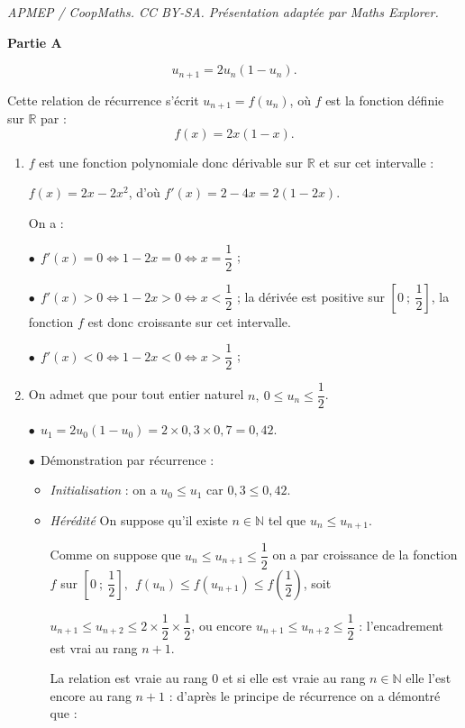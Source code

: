 \documentclass[10pt]{article}
\providecommand{\R}{\mathbb{R}}
\providecommand{\N}{\mathbb{N}}
\begin{document}
\noindent\textit{APMEP / CoopMaths. CC BY-SA. Présentation adaptée par Maths Explorer.}\par\medskip
\medskip

\textbf{Partie A}

\medskip


\[u_{n+1} =  2u_n\left(1 - u_n\right).\]

Cette relation de récurrence s'écrit $u_{n+1} =  f\left(u_n\right)$, où $f$ est la fonction définie sur $\R$ par :
\[f(x) = 2x(1 - x).\]

\smallskip
\begin{enumerate}
\item 
$f$ est une fonction polynomiale donc dérivable sur $\R$ et sur cet intervalle :

$f(x) = 2x - 2x^2$, d'où $f'(x) = 2 - 4x = 2(1 - 2x)$.

On a :

$\bullet~~$$f'(x) = 0 \iff 1 - 2x = 0 \iff x = \dfrac12$ ;

$\bullet~~$$f'(x) > 0 \iff 1 - 2x > 0 \iff x < \dfrac12$ ; la dérivée est positive sur $\left[0~;~\dfrac12\right]$, la fonction $f$ est donc croissante sur cet intervalle.

$\bullet~~$$f'(x) < 0 \iff 1 - 2x < 0 \iff x > \dfrac12$ ;
\item On admet que pour tout entier naturel $n,\:0 \leqslant u_n \leqslant \dfrac12$.


$\bullet~~$$u_1 = 2u_0\left(1 - u_0\right) = 2\times 0,3 \times 0,7= 0,42$.

$\bullet~~$Démonstration par récurrence :

\begin{itemize}
\item \emph{Initialisation} : on a $u_0 \leqslant u_1$ car $0,3 \leqslant 0,42$.
\item \emph{Hérédité} On suppose qu'il existe $n \in \N$  tel que $u_n \leqslant u_{n+1}$.

Comme on suppose que $u_n \leqslant u_{n+1} \leqslant \dfrac12$ on a par croissance de la fonction $f$ sur $\left[0~;~\dfrac12\right], \: \:f\left(u_n\right) \leqslant f\left(u_{n+1}\right) \leqslant f\left(\dfrac12\right)$, soit 

$u_{n+1} \leqslant u_{n+2} \leqslant 2 \times \dfrac12 \times \dfrac12$, ou encore $u_{n+1} \leqslant u_{n+2} \leqslant \dfrac12$ : l'encadrement est vrai au rang $n+1$.

La relation est vraie au rang 0 et si elle est vraie au rang $n \in \N$ elle l'est encore au rang $n + 1$ : d'après le principe de récurrence on a démontré que :


\end{itemize}
\end{enumerate}
\end{document}
